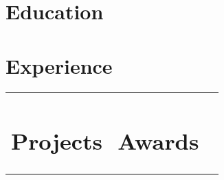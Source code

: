 \documentclass{cv}
\begin{document}

    \section{Education}
        

    \section{Experience}
        
        

    \hspace*{-0.9cm}
    \begin{tabular}{p{0.488\linewidth}p{0.488\linewidth}}
        \section{Projects}
        
        &

        \section{Awards}
            
            
            
    \end{tabular}
\end{document}
